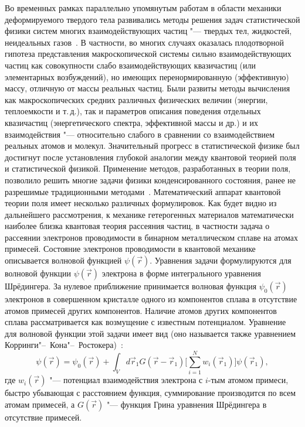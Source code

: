 Во временных рамках параллельно упомянутым работам в области
механики деформируемого твердого тела развивались методы решения
задач статистической физики систем многих взаимодействующих частиц
"--- твердых тел, жидкостей, неидеальных газов~\cite{tashk:bib5}.
В частности, во многих случаях оказалась плодотворной гипотеза
представления макроскопической системы сильно взаимодействующих
частиц как совокупности слабо взаимодействующих квазичастиц (или
элементарных возбуждений), но имеющих перенормированную
(эффективную) массу, отличную от массы реальных частиц. Были
развиты методы вычисления как макроскопических средних различных
физических величин (энергии, теплоемкости и т.\,д.), так и
параметров описания поведения отдельных квазичастиц
(энергетического спектра, эффективной массы и др.) и их
взаимодействия "--- относительно слабого в сравнении со
взаимодействием реальных атомов и молекул. Значительный прогресс в
статистической физике был достигнут после установления глубокой
аналогии между квантовой теорией поля и статистической физикой.
Применение методов, разработанных в теории поля, позволило решить
многие задачи физики конденсированного состояния, ранее не
разрешимые традиционными методами~\cite{tashk:bib6}.
Математический аппарат квантовой теории поля имеет несколько
различных формулировок. Как будет видно из дальнейшего
рассмотрения, к механике гетерогенных материалов математически
наиболее близка квантовая теория рассеяния частиц, в частности
задача о рассеянии электронов проводимости в бинарном
металлическом сплаве на атомах примесей. Состояние электронов
проводимости в квантовой механике описывается волновой функцией
$\psi(\vec {r})$. Уравнения задачи формулируются для волновой
функции $\psi (\vec {r})$ электрона в форме интегрального
уравнения Шрёдингера. 
За нулевое приближение принимается волновая функция $\psi_0(\vec {r})$ электронов в совершенном кристалле
одного из компонентов сплава в отсутствие атомов примесей других
компонентов. Наличие атомов других компонентов сплава
рассматривается как возмущение с известным потенциалом. Уравнение
для волновой функции этой задачи имеет вид (оно называется также
уравнением Корринги"--~Кона"--~Ростокера)~\cite{tashk:bib7,tashk:bib8}:
\begin{equation}
\label{tashk:eq1}
\psi (\vec {r})=\psi _0 (\vec {r})+\int_V d\vec {r}_1 G(\vec
{r}-\vec {r}_1 )\biggl[ \sum\limits_{i=1}^N w_i ( \vec {r}_1 )
\biggr]\psi (\vec {r}_1 ),
\end{equation}
где $w_i (\vec {r})$ "--- потенциал взаимодействия электрона с $i$-тым атомом
примеси, быстро убывающая с расстоянием функция, суммирование производится
по всем атомам примесей, а $G(\vec {r})$ "--- функция Грина уравнения Шрёдингера
в отсутствие примесей.

